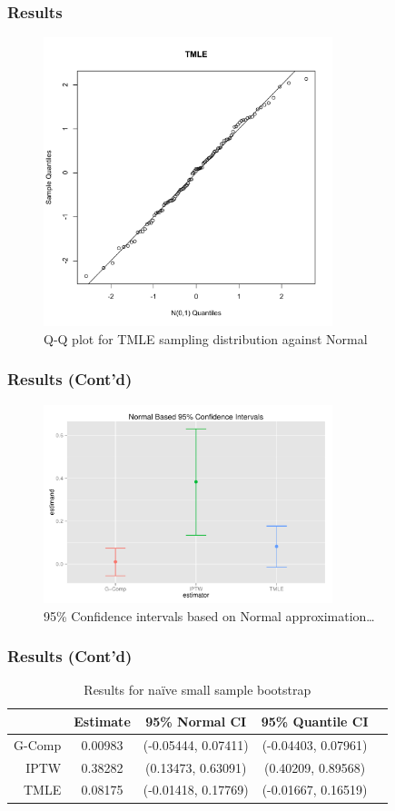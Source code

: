 \documentclass{beamer}
\begin{document}
\begin{frame}
\frametitle{Results}
\begin{figure}
\centering
\includegraphics[width=0.75\textwidth]{tmle_qqplot.pdf}
\caption{Q-Q plot for TMLE sampling distribution against Normal}
\end{figure}
\end{frame}

\begin{frame}
\frametitle{Results (Cont'd)}
\begin{figure}[ht!]
\centering
\includegraphics[width=0.75\textwidth]{bootstrap-normal-ci.pdf}
\caption{95\% Confidence intervals based on Normal approximation\ldots}
\end{figure}
\end{frame}

\begin{frame}
\frametitle{Results (Cont'd)}
\begin{table}[ht]
\centering
{\small
\begin{tabular}{rcccc}
  \hline
 & Estimate & 95\% Normal CI & 95\% Quantile CI \\ 
  \hline
G-Comp & 0.00983 & (-0.05444, 0.07411) & (-0.04403, 0.07961) \\ 
  IPTW & 0.38282 & (0.13473, 0.63091) & (0.40209, 0.89568) \\ 
  TMLE & 0.08175 & (-0.01418, 0.17769) & (-0.01667, 0.16519) \\ 
   \hline
\end{tabular}
}
\caption{Results for na\"{i}ve small sample bootstrap}
\end{table}
\end{frame}
\end{document}
